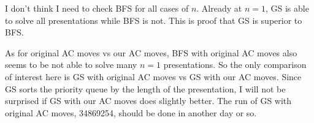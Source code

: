 \begin{figure}
\end{figure}
	
I don't think I need to check BFS for all cases of $n$. Already at $n=1$, GS is able to solve all presentations while BFS is not. This is proof that GS is superior to BFS.



As for original AC moves vs our AC moves, BFS with original AC moves also seems to be not able to solve many $n=1$ presentations. So the only comparison of interest here is GS with original AC moves vs GS with our AC moves. Since GS sorts the priority queue by the length of the presentation, I will not be surprised if GS with our AC moves does slightly better. The run of GS with original AC moves,  34869254, should be done in another day or so.




